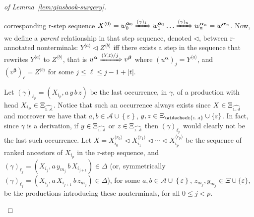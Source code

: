 \documentclass[final]{llncs}
\def\set#1{{\left\{ #1 \right\}}}
\def\tuple#1{{\langle #1 \rangle}}
\def\len#1{{\vert{#1}\vert}}
\def\prod{\Delta}
\def\Vars{\ensuremath{\Xi}}
\def\Varsi{\ensuremath{\Xi_{\widecheck{\text{\tiny 1..d}}}}}
\def\Varse{\ensuremath{\Xi_{\widehat{\text{\tiny 1..d}}}}}
\begin{document}
\begin{proof}[of Lemma~\ref{lem:ginsbook-surgery}]
\begin{compactenum}[1.]
  corresponding r-step sequence $X^{\tuple{0}}=w_0^{\boldsymbol{\alpha}_0}
  \xRightarrow{ (\gamma)_1 } w_1^{\boldsymbol{\alpha}_1} \ldots
  \xRightarrow{ (\gamma)_n } w_n^{\boldsymbol{\alpha}_{n}}=w^{\boldsymbol{\alpha}_{n}}$.  Now, we define a
  \emph{parent} relationship in that step sequence, denoted
  \(\triangleleft\), between r-annotated nonterminals: $Y^{\tuple{a}}
  \mathbin{\triangleleft} Z^{\tuple{b}}$
  if{}f there exists a step in the sequence that rewrites
  \(Y^{\tuple{a}}\) to \(Z^{\tuple{b}}\), that is \(u^{\boldsymbol{\alpha}} \xRightarrow{(Y,t)/j} v^{\boldsymbol{\beta}}\)
	where \( (u^{\boldsymbol{\alpha}})_{j} = Y^{\tuple{a}} \), and \( (v^{\boldsymbol{\beta}})_{\ell} = Z^{\tuple{b}} \) for some \(j\leq \ell \leq j-1+\len{t}\).

  Let $(\gamma)_{\ell_p} = (X_{i_p},a\, y\, b\, z)$ be the last occurrence, in
  \(\gamma\), of a production with head $X_{i_p} \in \Varse$.  Notice
  that such an occurrence always exists since \(X \in \Varse\) and
	moreover we have that \(a,b\in \mathcal{A} \cup \set{\varepsilon}\), \(y,z \in \Varsi \cup 
  \set{\varepsilon}\). In fact, since \(\gamma\) is a derivation, if
  \(y\in\Varse\) or \(z\in\Varse\) then \( (\gamma)_{\ell_p} \) would
  clearly not be the last such occurrence. Let $X=X_{i_0}^{\tuple{r_0}}
  \mathbin{\triangleleft} X_{i_1}^{\tuple{r_1}} \mathbin{\triangleleft}
  \cdots \mathbin{\triangleleft} X_{i_p}^{\tuple{r_p}}$ be the
  sequence of ranked ancestors of $X_{i_p}$ in the r-step
  sequence, and \((\gamma)_{\ell_j} = (X_{i_j},a\, y_{m_j}\, b\, X_{i_{j+1}}) \in \prod\) (or, symmetrically
\( (\gamma)_{\ell_j} = (X_{i_j}, a\, X_{i_{j+1}}\, b\, z_{m_j}) \in \prod \)),
	for some \(a,b\in \mathcal{A}\cup\set{\varepsilon}\), $z_{m_j}, y_{m_j} \in
	\Vars \cup \{\varepsilon\}$, be the productions introducing these
	nonterminals, for all $0 \leq j < p$.


\end{compactenum}
\end{proof}
\end{document}
